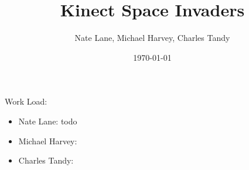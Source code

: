 \documentclass[12pt,conference]{IEEEtran}
\title{Kinect Space Invaders}
\date{\today}
\author{Nate Lane, Michael Harvey, Charles Tandy}
\begin{document}
\maketitle
\thispagestyle{plain}
\pagestyle{plain}




\appendix
Work Load:
\begin{itemize}
\item Nate Lane: todo
\item Michael Harvey:
\item Charles Tandy: 
\end{itemize}
\end{document}
